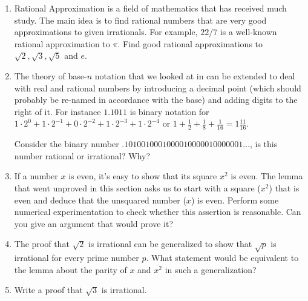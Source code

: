 \begin{enumerate}

\item {} Rational Approximation is 
a field of mathematics that has received much study.  The main idea 
is to find rational numbers that are very good approximations to
given irrationals.  For example, $22/7$ is a well-known rational 
approximation to $\pi$.  Find good rational approximations to 
$\sqrt{2}, \sqrt{3}, \sqrt{5}$ and $e$.

\item The theory of base-$n$ notation that we looked at in 
 can be extended to deal with real and 
rational numbers by introducing a decimal point (which should 
probably be re-named in accordance with the base) and adding 
digits to the right of it.  For instance $1.1011$ is binary notation
for $1 \cdot 2^0 + 1 \cdot 2^{-1} + 0 \cdot 2^{-2} + 
1\cdot 2^{-3} + 1\cdot 2^{-4}$ or $\displaystyle 1 + \frac{1}{2} + 
\frac{1}{8} + \frac{1}{16} = 1 \frac{11}{16}$.

Consider the binary number $.1010010001000010000010000001\ldots$, 
is this number rational or irrational?  Why?

\item If a number $x$ is even, it's easy to show that its square $x^2$
is even.  The lemma that went unproved in this section asks us to
start with a square ($x^2$) that is even and deduce that the unsquared
number ($x$) is even.  Perform some numerical experimentation to
check whether this assertion is reasonable.  Can you give an argument
that would prove it?

\item The proof that $\sqrt{2}$ is irrational can be generalized 
to show that $\sqrt{p}$ is irrational for every prime number $p$.
What statement would be equivalent to the lemma about the parity
of $x$ and $x^2$ in such a generalization?

\item Write a proof that $\sqrt{3}$ is irrational.

\end{enumerate}